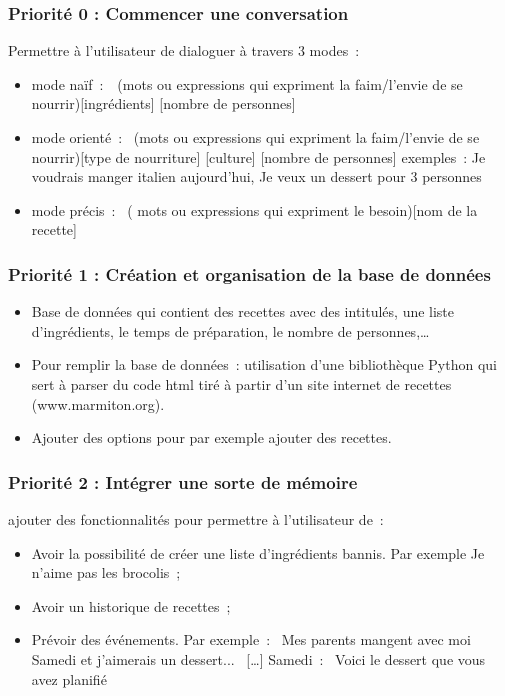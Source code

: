 \documentclass{report}
\begin{document}
\subsubsection{Priorité 0 :  Commencer une conversation } Permettre à l'utilisateur de dialoguer à travers 3 modes : 
\begin{itemize}
\item mode naïf : \og (mots ou expressions qui expriment la faim/l'envie de se nourrir)[ingrédients] [nombre de personnes]\fg{}
\item mode orienté : \og (mots ou expressions qui expriment la faim/l'envie de se nourrir)[type de nourriture] [culture] [nombre de personnes]\fg{}
exemples : Je voudrais manger italien aujourd'hui, Je veux un dessert pour 3 personnes
\item  mode précis : \og ( mots ou expressions qui expriment le besoin)[nom de la recette]\fg{}
\end{itemize}
\subsubsection{Priorité 1 : Création et organisation de la base de données}
\begin{itemize}
\item Base de données qui contient des recettes avec des intitulés, une liste d'ingrédients, le temps de préparation, le nombre de personnes,…
\item Pour remplir la base de données : utilisation d'une bibliothèque Python qui sert à parser du code html tiré à partir d'un site internet de recettes (www.marmiton.org).
\item Ajouter des options pour par exemple ajouter des recettes. 
\end{itemize}
\subsubsection{Priorité 2 :  Intégrer une sorte de mémoire} ajouter des fonctionnalités pour permettre à l'utilisateur de :
\begin{itemize}
\item Avoir la possibilité de créer une liste d'ingrédients bannis. Par exemple \og Je n'aime pas les brocolis \fg{};
\item Avoir un historique de recettes ;
\item Prévoir des événements. Par exemple : \og Mes parents mangent avec moi Samedi et j'aimerais un dessert... \fg{} […] Samedi : \og Voici le dessert que vous avez planifié \fg{}
\end{itemize}
\end{document}
